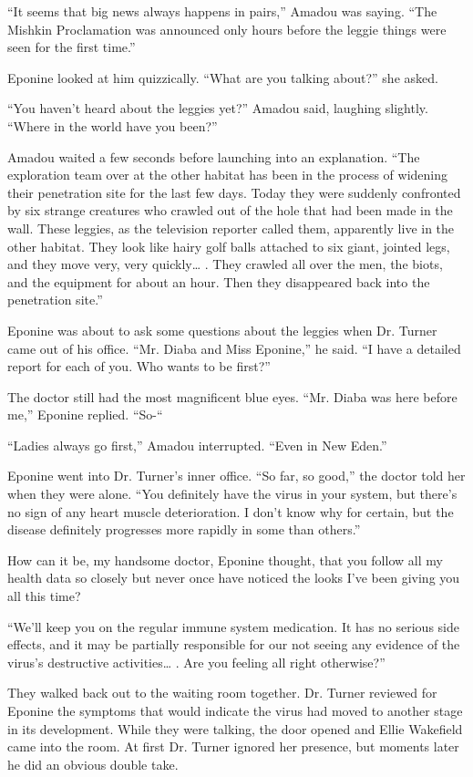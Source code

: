 \documentclass[]{article}
\begin{document}
{“It seems that big news always happens in pairs,” Amadou was saying. “The Mishkin Proclamation was announced only hours before the leggie things were seen for the first time.”

Eponine looked at him quizzically. “What are you talking about?” she asked.

“You haven’t heard about the leggies yet?” Amadou said, laughing slightly. “Where in the world have you been?”

Amadou waited a few seconds before launching into an explanation. “The exploration team over at the other habitat has been in the process of widening their penetration site for the last few days. Today they were suddenly confronted by six strange creatures who crawled out of the hole that had been made in the wall. These leggies, as the television reporter called them, apparently live in the other habitat. They look like hairy golf balls attached to six giant, jointed legs, and they move very, very quickly… . They crawled all over the men, the biots, and the equipment for about an hour. Then they disappeared back into the penetration site.”

Eponine was about to ask some questions about the leggies when Dr. Turner came out of his office. “Mr. Diaba and Miss Eponine,” he said. “I have a detailed report for each of you. Who wants to be first?”

The doctor still had the most magnificent blue eyes. “Mr. Diaba was here before me,” Eponine replied. “So-“

“Ladies always go first,” Amadou interrupted. “Even in New Eden.”

Eponine went into Dr. Turner’s inner office. “So far, so good,” the doctor told her when they were alone. “You definitely have the virus in your system, but there’s no sign of any heart muscle deterioration. I don’t know why for certain, but the disease definitely progresses more rapidly in some than others.”

How can it be, my handsome doctor, Eponine thought, that you follow all my health data so closely but never once have noticed the looks I’ve been giving you all this time?

“We’ll keep you on the regular immune system medication. It has no serious side effects, and it may be partially responsible for our not seeing any evidence of the virus’s destructive activities… . Are you feeling all right otherwise?”

They walked back out to the waiting room together. Dr. Turner reviewed for Eponine the symptoms that would indicate the virus had moved to another stage in its development. While they were talking, the door opened and Ellie Wakefield came into the room. At first Dr. Turner ignored her presence, but moments later he did an obvious double take.

}
\end{document}
